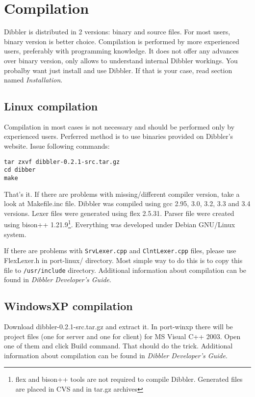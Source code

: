 \section{Compilation}
Dibbler is distributed in 2 versions: binary and source files. For
most users, binary version is better choice.  Compilation is
performed by more experienced users, preferably with programming
knowledge. It does not offer any advances over binary version, only
allows to understand internal Dibbler workings. You probalby want just
install and use Dibbler. If that is your case, read section
named \emph{Installation}.

\subsection{Linux compilation}

Compilation in most cases is not necessary and should be performed
only by experienced users. Perferred method is to use binaries
provided on Dibbler's website. Issue following commands:
\begin{verbatim}
tar zxvf dibbler-0.2.1-src.tar.gz
cd dibber
make
\end{verbatim}
That's it. If there are problems with missing/different compiler
version, take a look at Makefile.inc file. Dibbler was compiled using
gcc 2.95, 3.0, 3.2, 3.3 and 3.4 versions. Lexer files were generated using
flex 2.5.31. Parser file were created using bison++
1.21.9\footnote{flex and bison++ tools are not required to compile
  Dibbler. Generated files are placed in CVS and in tar.gz
  archives}. Everything was developed under Debian GNU/Linux system.

If there are problems with \verb+SrvLexer.cpp+ and
\verb+ClntLexer.cpp+ files, please use FlexLexer.h in port-linux/
directory. Most simple way to do this is to copy this file to
\verb+/usr/include+ directory. Additional information about
compilation can be found in \emph{Dibbler Developer's Guide}.

\subsection{WindowsXP compilation}
Download dibbler-0.2.1-src.tar.gz and extract it. In port-winxp there
will be project files (one for server and one for client) for MS
Visual C++ 2003. Open one of them and click Build command. That should
do the trick. Additional information about compilation can be found in
\emph{Dibbler Developer's Guide}.
